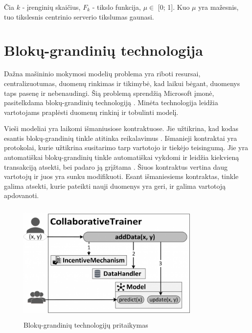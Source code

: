 \documentclass{VUMIFInfBakalaurinis}
\begin{document}
\par Čia $k$ - įrenginių skaičius, $F_{k}$ - tikslo funkcija, $\mu \in$ [0; 1]. Kuo $\mu$ yra mažesnis, tuo tikslesnis centrinio serverio tikslumas gaunasi.

\section{Blokų-grandinių technologija}
\par Dažna mašininio mokymosi modelių problema yra riboti resursai, centralizuotumas, duomenų rinkimas ir tikimybė, kad laikui bėgant, duomenys taps pasenę ir nebenaudingi. Šią problemą sprendžią Microsoft įmonė, pasitelkdama blokų-grandinių technologiją \cite{25}.  Minėta technologija leidžia vartotojams praplėsti duomenų rinkinį ir tobulinti modelį.
\par Vieši modeliai yra laikomi išmaniusiose kontraktuose. Jie užtikrina, kad kodas esantis blokų-grandinių tinkle atitinka reikalavimus \cite{25}.  Išmanieji kontraktai yra protokolai, kurie užtikrina susitarimo tarp vartotojo ir tiekėjo teisingumą. Jie yra automatiškai blokų-grandinių tinkle automatiškai vykdomi ir leidžia kiekvieną transakciją atsekti, bei padaro ją grįžtama \cite{26}. Šiuos kontraktus vertina daug vartotojų ir juos yra sunku modifikuoti. Esant išmaniesiems kontraktas, tinkle galima atsekti, kurie pateikti nauji duomenys yra geri, ir galima vartotoją apdovanoti.

\begin{figure}[h]
  \centering
  \includegraphics[width=9cm,height=6cm,keepaspectratio]{img/blockchain_1.png}
  \caption{Blokų-grandinių technologijų pritaikymas \cite{25}}
  \label{fig:Blokų-grandinių technologijų pritaikymas}
\end{figure}
\end{document}

